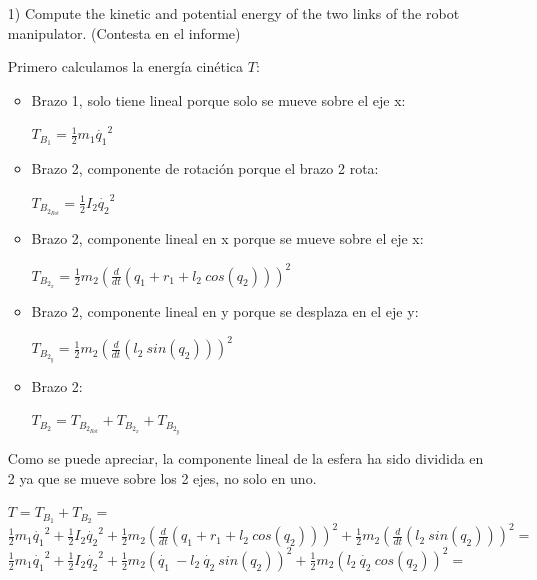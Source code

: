 \documentclass[a4paper]{article}
\begin{document}
\begin{itemize}

\item[1)] {\color{gray} Compute the kinetic and potential energy of the two links of the robot manipulator. (Contesta en el informe)}


\bigskip

Primero calculamos la energía cinética $T$:
\begin{itemize}
	\item Brazo 1, solo tiene lineal porque solo se mueve sobre el eje x: 
	\begin{center}
		$T_{B_{1}} = \frac{1}{2}m_{1}\dot{q_{1}}^2$
	\end{center}
	\item Brazo 2, componente de rotación porque el brazo 2 rota:
	\begin{center}
		$T_{B_{2_{Rot}}} = \frac{1}{2}I_{2}\dot{q_{2}}^2$
	\end{center}
	\item Brazo 2, componente lineal en x porque se mueve sobre el eje x: 
	\begin{center}
		$T_{B_{2_{x}}} = \frac{1}{2}m_{2}(\frac{d}{dt}(q_{1}+r_{1}+l_{2}\ cos(q_{2})))^2$	
	\end{center}
	\item Brazo 2, componente lineal en y porque se desplaza en el eje y: 
	\begin{center}
		$T_{B_{2_{y}}} = \frac{1}{2}m_{2}(\frac{d}{dt}(l_{2}\ sin(q_{2})))^2$
	\end{center}
	\item Brazo 2:
	\begin{center} 
		$T_{B_{2}} = T_{B_{2_{Rot}}} + T_{B_{2_{x}}} + T_{B_{2_{y}}}$
	\end{center}
\end{itemize}
Como se puede apreciar, la componente lineal de la esfera ha sido dividida en 2 ya que se mueve sobre los 2 ejes, no solo en uno.\\
\begin{center}
	$T = T_{B_{1}} + T_{B_{2}} =$\\
	
	$\frac{1}{2}m_{1}\dot{q_{1}}^2 + \frac{1}{2}I_{2}\dot{q_{2}}^2 + \frac{1}{2}m_{2}(\frac{d}{dt}(q_{1}+r_{1}+l_{2}\ cos(q_{2})))^2 + \frac{1}{2}m_{2}(\frac{d}{dt}(l_{2}\ sin(q_{2})))^2 =$\\
	 
	$\frac{1}{2}m_{1}\dot{q_{1}}^2 + \frac{1}{2}I_{2}\dot{q_{2}}^2 + \frac{1}{2}m_{2}(\dot{q_{1}}\ - l_{2}\ \dot{q_{2}}\ sin(q_{2}))^2 + \frac{1}{2}m_{2}(l_{2}\ \dot{q_{2}}\ cos(q_{2}))^2 =$
	

\end{center}
\end{itemize}
\end{document}
